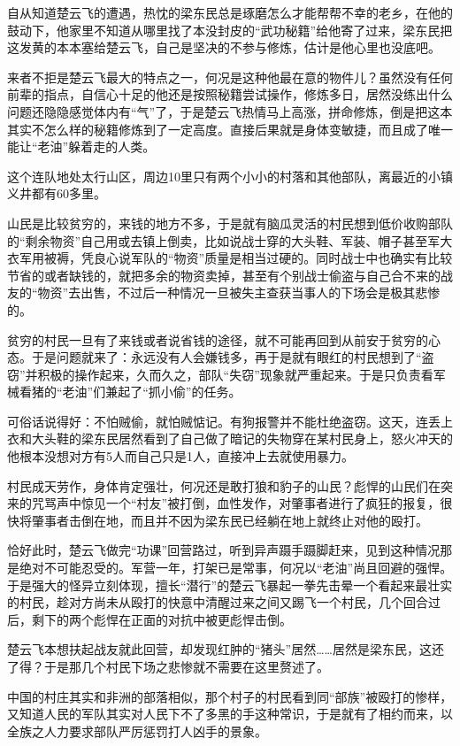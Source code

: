 自从知道楚云飞的遭遇，热忱的梁东民总是琢磨怎么才能帮帮不幸的老乡，在他的鼓动下，他家里不知道从哪里找了本没封皮的“武功秘籍”给他寄了过来，梁东民把这发黄的本本塞给楚云飞，自己是坚决的不参与修炼，估计是他心里也没底吧。

来者不拒是楚云飞最大的特点之一，何况是这种他最在意的物件儿？虽然没有任何前辈的指点，自信心十足的他还是按照秘籍尝试操作，修炼多日，居然没练出什么问题还隐隐感觉体内有“气”了，于是楚云飞热情马上高涨，拼命修炼，倒是把这本其实不怎么样的秘籍修炼到了一定高度。直接后果就是身体变敏捷，而且成了唯一能让“老油”躲着走的人类。

这个连队地处太行山区，周边10里只有两个小小的村落和其他部队，离最近的小镇义井都有60多里。

山民是比较贫穷的，来钱的地方不多，于是就有脑瓜灵活的村民想到低价收购部队的“剩余物资”自己用或去镇上倒卖，比如说战士穿的大头鞋、军装、帽子甚至军大衣军用被褥，凭良心说军队的“物资”质量是相当过硬的。同时战士中也确实有比较节省的或者缺钱的，就把多余的物资卖掉，甚至有个别战士偷盗与自己合不来的战友的“物资”去出售，不过后一种情况一旦被失主查获当事人的下场会是极其悲惨的。

贫穷的村民一旦有了来钱或者说省钱的途径，就不可能再回到从前安于贫穷的心态。于是问题就来了：永远没有人会嫌钱多，再于是就有眼红的村民想到了“盗窃”并积极的操作起来，久而久之，部队“失窃”现象就严重起来。于是只负责看军械看猪的“老油”们兼起了“抓小偷”的任务。

可俗话说得好：不怕贼偷，就怕贼惦记。有狗报警并不能杜绝盗窃。这天，连丢上衣和大头鞋的梁东民居然看到了自己做了暗记的失物穿在某村民身上，怒火冲天的他根本没想对方有5人而自己只是1人，直接冲上去就使用暴力。

村民成天劳作，身体肯定强壮，何况还是敢打狼和豹子的山民？彪悍的山民们在突来的咒骂声中惊见一个“村友”被打倒，血性发作，对肇事者进行了疯狂的报复，很快将肇事者击倒在地，而且并不因为梁东民已经躺在地上就终止对他的殴打。

恰好此时，楚云飞做完“功课”回营路过，听到异声蹑手蹑脚赶来，见到这种情况那是绝对不可能忍受的。军营一年，打架已是常事，何况以“老油”尚且回避的强悍。于是强大的怪异立刻体现，擅长“潜行”的楚云飞暴起一拳先击晕一个看起来最壮实的村民，趁对方尚未从殴打的快意中清醒过来之间又踢飞一个村民，几个回合过后，剩下的两个彪悍在正面的对抗中被更彪悍击倒。

楚云飞本想扶起战友就此回营，却发现红肿的“猪头”居然……居然是梁东民，这还了得？于是那几个村民下场之悲惨就不需要在这里赘述了。

中国的村庄其实和非洲的部落相似，那个村子的村民看到同“部族”被殴打的惨样，又知道人民的军队其实对人民下不了多黑的手这种常识，于是就有了相约而来，以全族之人力要求部队严厉惩罚打人凶手的景象。

